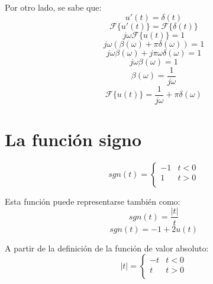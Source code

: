Por otro lado, se sabe que:
\begin{equation*}
    u'(t)=\delta(t)
\end{equation*}
\begin{equation*}
    \mathcal{F}\{u'(t)\}=\mathcal{F}\{\delta(t)\}
\end{equation*}
\begin{equation*}
    j\omega\mathcal{F}\{u(t)\}=1
\end{equation*}
\begin{equation*}
    j\omega(\beta(\omega)+\pi\delta(\omega))=1
\end{equation*}
\begin{equation*}
    j\omega\beta(\omega)+j\pi\omega\delta(\omega)=1
\end{equation*}
\begin{equation*}
    j\omega\beta(\omega)=1
\end{equation*}
\begin{equation*}
    \beta(\omega)=\frac{1}{j\omega}
\end{equation*}
\begin{equation}
    \mathcal{F}\{u(t)\}=\frac{1}{j\omega}+\pi\delta(\omega)
\end{equation}

\section{La función signo}
\begin{equation}
    sgn(t)=\begin{cases}
        -1 & t<0\\
        1 & t>0\\
    \end{cases}
\end{equation}
\begin{figure}[H]
    \centering
    
\end{figure}

Esta función puede representarse también como:
\begin{equation*}
    sgn(t)=\frac{|t|}{t}
\end{equation*}
\begin{equation*}
    sgn(t)=-1+2u(t)
\end{equation*}

A partir de la definición de la función de valor absoluto:
\begin{equation*}
    |t|=\begin{cases}
        -t & t<0\\
        t & t>0\\
    \end{cases}
\end{equation*}

